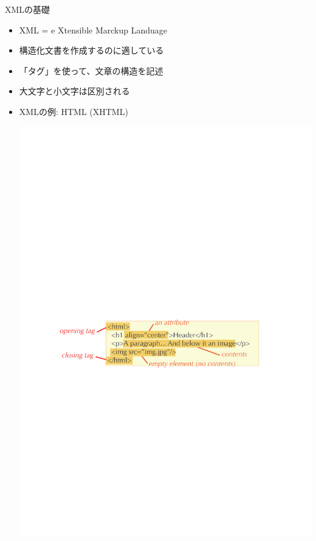 \begin{frame}{XMLの基礎}
  \begin{itemize}
  \item XML = e{\color{red} X}tensible {\color{red} M}arckup {\color{red} L}anduage
  \item 構造化文書を作成するのに適している
  \item 「タグ」を使って、文章の構造を記述
  \item 大文字と小文字は区別される
  \item XMLの例: HTML (XHTML)
  \begin{center}
    \includegraphics[height=0.3\textheight]{xml1.pdf}
  \end{center}
  \end{itemize}
\end{frame}

\subsection*{\redm\whitem\greenb}

